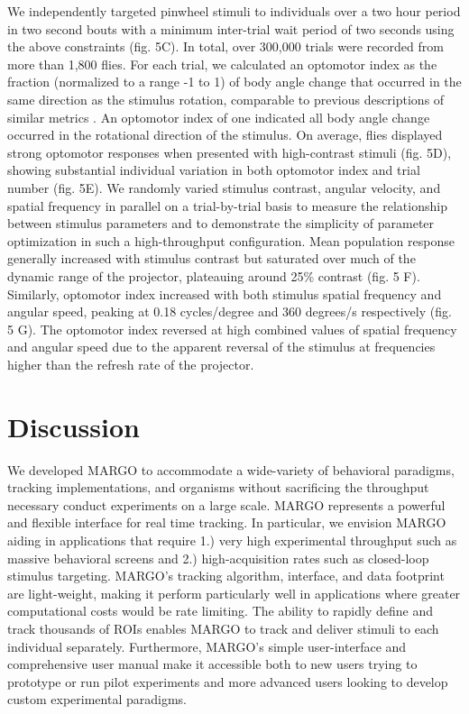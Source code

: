 \documentclass[10pt]{article}
\begin{document}
\begin{multicols}{2}
We independently targeted pinwheel stimuli to individuals over a two hour period in two second bouts with a minimum inter-trial wait period of two seconds using the above constraints (fig. 5C). In total, over 300,000 trials were recorded from more than 1,800 flies. For each trial, we calculated an optomotor index as the fraction (normalized to a range -1 to 1) of body angle change that occurred in the same direction as the stimulus rotation, comparable to previous descriptions of similar metrics \cite{Seelig_Two_2010}. An optomotor index of one indicated all body angle change occurred in the rotational direction of the stimulus. On average, flies displayed strong optomotor responses when presented with high-contrast stimuli (fig. 5D), showing substantial individual variation in both optomotor index and trial number (fig. 5E). We randomly varied stimulus contrast, angular velocity, and spatial frequency in parallel on a trial-by-trial basis to measure the relationship between stimulus parameters and to demonstrate the simplicity of parameter optimization in such a high-throughput configuration. Mean population response generally increased with stimulus contrast but saturated over much of the dynamic range of the projector, plateauing around 25\% contrast (fig. 5 F). Similarly, optomotor index increased with both stimulus spatial frequency and angular speed, peaking at 0.18 cycles/degree and 360 degrees/s respectively (fig. 5 G). The optomotor index reversed at high combined values of spatial frequency and angular speed due to the apparent reversal of the stimulus at frequencies higher than the refresh rate of the projector.


\section*{Discussion}

We developed MARGO to accommodate a wide-variety of behavioral paradigms, tracking implementations, and organisms without sacrificing the throughput necessary conduct experiments on a large scale. MARGO represents a powerful and flexible interface for real time tracking. In particular, we envision MARGO aiding in applications that require 1.) very high experimental throughput such as massive behavioral screens and 2.) high-acquisition rates such as closed-loop stimulus targeting. MARGO's tracking algorithm, interface, and data footprint are light-weight, making it perform particularly well in applications where greater computational costs would be rate limiting. The ability to rapidly define and track thousands of ROIs enables MARGO to track and deliver stimuli to each individual separately. Furthermore, MARGO's simple user-interface and comprehensive user manual make it accessible both to new users trying to prototype or run pilot experiments and more advanced users looking to develop custom experimental paradigms.


\end{multicols}
\end{document}
